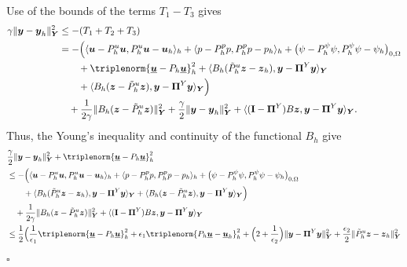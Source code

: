 \documentclass[smallextended]{svjour3}
\renewenvironment{proof}{\noindent{\it Proof.}}{\hfill$\square$}
\numberwithin{equation}{section}
\numberwithin{figure}{section}
\numberwithin{table}{section}
\newcommand\bI{\mathbf{I}}
\newcommand\bPi{\boldsymbol{\Pi}}
\newcommand{\tP}{\tilde{P}}
\newcommand\buu{\underline{\boldsymbol{u}}}
\newcommand\by{\boldsymbol{y}}
\newcommand\bu{\boldsymbol{u}}
\newcommand\bz{\boldsymbol{z}}
\newcommand{\bY}{\boldsymbol{Y}}
\begin{document}
\begin{proof}
    Use of the bounds of the terms $T_1- T_3$ gives
    \begin{align*}
        \gamma \| \by - \by_h \|_{\bY}^2 & \le -(T_1 +T_2 + T_3) \\
        & = - \Big( \langle \bu - P_h^u \bu, P_h^u \bu - \bu_h \rangle_h 
        + \langle p - P_h^p p, P_h^p p - p_h \rangle_h  
        +\big( \psi- P_h^\psi \psi, P_h^\psi \psi - \psi_h\big)_{0, \Omega}
        \\
		& \qquad  
        + \triplenorm{ \buu - P_h \buu}_h^2
        + \langle B_h (\tP_h^u \bz - \bz_h), \by - \bPi^Y \by \rangle_{\bY} \\
        & \qquad + \langle B_h (\bz- \tP_h^u \bz), \by - \bPi^Y \by \rangle_{\bY} \Big) \\
        & \quad + \frac{1}{2 \gamma}\|  B_h( \bz - \tP_h^u \bz)\|_{\bY}^2 + \frac{\gamma}{2} \| \by - \by_h \|_{\bY}^2 + \langle (\bI - \bPi^Y) B \bz, \by - \bPi^Y \by \rangle_{\bY}.
    \end{align*}
Thus, the Young's inequality and continuity of the functional $B_h$ give
    \begin{align*}
        & \frac{\gamma}{2} \| \by - \by_h \|_{\bY}^2 + \triplenorm{ \buu - P_h \buu}_h^2
        \\
        & \le - \Big( \langle \bu - P_h^u \bu, P_h^u \bu - \bu_h \rangle_h + \langle p - P_h^p p, P_h^p p - p_h \rangle_h  
        +\big( \psi- P_h^\psi \psi, P_h^\psi \psi - \psi_h\big)_{0, \Omega}\\
        & \qquad + \langle B_h (\tP_h^u \bz - \bz_h), \by - \bPi^Y \by \rangle_{\bY} + \langle B_h (\bz- \tP_h^u \bz), \by - \bPi^Y \by \rangle_{\bY} \Big) \\
        & \quad + \frac{1}{2 \gamma} \|  B_h( \bz - \tP_h^u \bz)\|_{\bY}^2 + \langle (\bI - \bPi^Y) B \bz, \by - \bPi^Y \by \rangle_{\bY} \\
        & \le \frac{1}{2} \Big( \frac{1}{\epsilon_1} \triplenorm{ \buu - P_h \buu}_h^2 + {\epsilon_1} \triplenorm{ P_h \buu - \buu_h }_h^2 + \Big( 2+\frac{1}{\epsilon_2} \Big) \| \by - \bPi^Y \by\|_{\bY}^2 + \frac{\epsilon_2}{2}\|  \tP_h^u \bz - \bz_h\|_{\bY}^2  \\

\end{align*}
\end{proof}
\end{document}
